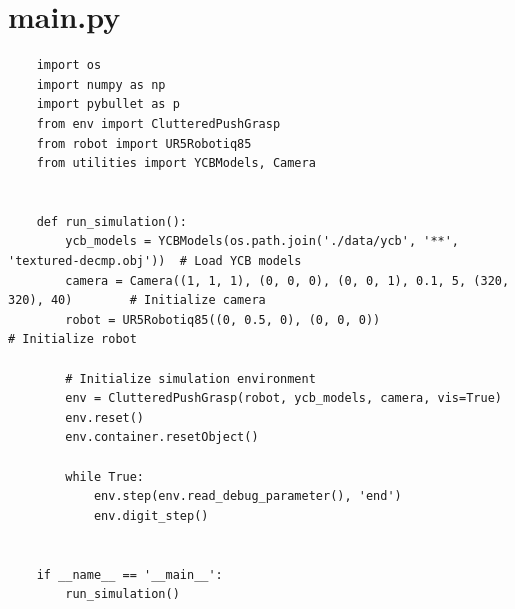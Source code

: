 \documentclass[11pt, a4paper]{report}
\begin{document}
\section{main.py}
\begin{lstlisting}
    import os
    import numpy as np
    import pybullet as p
    from env import ClutteredPushGrasp
    from robot import UR5Robotiq85
    from utilities import YCBModels, Camera
    
    
    def run_simulation():
        ycb_models = YCBModels(os.path.join('./data/ycb', '**', 'textured-decmp.obj'))  # Load YCB models
        camera = Camera((1, 1, 1), (0, 0, 0), (0, 0, 1), 0.1, 5, (320, 320), 40)        # Initialize camera
        robot = UR5Robotiq85((0, 0.5, 0), (0, 0, 0))                                    # Initialize robot
    
        # Initialize simulation environment
        env = ClutteredPushGrasp(robot, ycb_models, camera, vis=True)
        env.reset()
        env.container.resetObject()
    
        while True:
            env.step(env.read_debug_parameter(), 'end')
            env.digit_step()
    
    
    if __name__ == '__main__':
        run_simulation()
\end{lstlisting}
\end{document}
